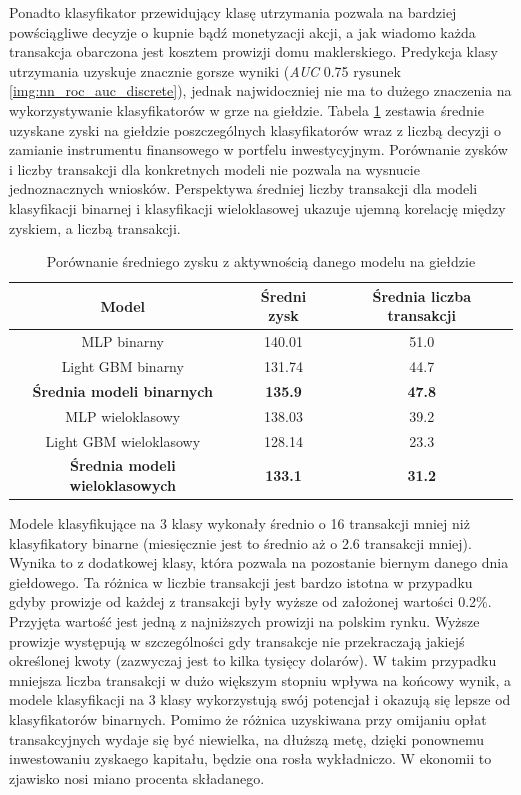 \documentclass[a4paper, twoside, 11pt, openright]{article}
\begin{document}
Ponadto klasyfikator przewidujący klasę utrzymania pozwala na bardziej powściągliwe decyzje o kupnie bądź monetyzacji akcji, a jak wiadomo każda transakcja obarczona jest kosztem prowizji domu maklerskiego. Predykcja klasy utrzymania uzyskuje znacznie gorsze wyniki (\textit{AUC} 0.75 rysunek \ref{img:nn_roc_auc_discrete}), jednak najwidoczniej nie ma to dużego znaczenia na wykorzystywanie klasyfikatorów w grze na giełdzie. Tabela \ref{tab:simulation_avg_value_vs_transactions} zestawia średnie uzyskane zyski na giełdzie poszczególnych klasyfikatorów wraz z liczbą decyzji o zamianie instrumentu finansowego w portfelu inwestycyjnym. Porównanie zysków i liczby transakcji dla konkretnych modeli nie pozwala na wysnucie jednoznacznych wniosków. Perspektywa średniej liczby transakcji dla modeli klasyfikacji binarnej i klasyfikacji wieloklasowej ukazuje ujemną korelację między zyskiem, a liczbą transakcji.


 \begin{table}[H]
    \centering
    \begin{tabular}{|c|c|c|}
    \hline
        \textbf{Model}  & \textbf{Średni zysk} & \textbf{Średnia liczba transakcji}\\ \hline
            MLP binarny & 140.01 & 51.0 \\ \hline
            Light GBM binarny & 131.74 & 44.7 \\ \hline 
            \textbf{Średnia modeli binarnych} & \textbf{135.9} & \textbf{47.8} \\ \hline \hline
            
            MLP wieloklasowy & 138.03 & 39.2 \\ \hline
            Light GBM wieloklasowy & 128.14 & 23.3 \\ \hline
            \textbf{Średnia modeli wieloklasowych} & \textbf{133.1} & \textbf{31.2} \\ \hline
    \end{tabular}
    \caption{Porównanie średniego zysku z aktywnością danego modelu na giełdzie}
    \label{tab:simulation_avg_value_vs_transactions}
\end{table} 

 Modele klasyfikujące na 3 klasy wykonały średnio o 16 transakcji mniej niż klasyfikatory binarne (miesięcznie jest to średnio aż o 2.6 transakcji mniej). Wynika to z dodatkowej klasy, która pozwala na pozostanie biernym danego dnia giełdowego. Ta różnica w liczbie transakcji jest bardzo istotna w przypadku gdyby prowizje od każdej z transakcji były wyższe od założonej wartości 0.2\%. Przyjęta wartość jest jedną z najniższych prowizji na polskim rynku. Wyższe prowizje występują w szczególności gdy transakcje nie przekraczają jakiejś określonej kwoty (zazwyczaj jest to kilka tysięcy dolarów). W takim przypadku mniejsza liczba transakcji w dużo większym stopniu wpływa na końcowy wynik, a modele klasyfikacji na 3 klasy wykorzystują swój potencjał i okazują się lepsze od klasyfikatorów binarnych. Pomimo że różnica uzyskiwana przy omijaniu opłat transakcyjnych wydaje się być niewielka, na dłuższą metę, dzięki ponownemu inwestowaniu zyskaego kapitału, będzie ona rosła wykładniczo. W ekonomii to zjawisko nosi miano procenta składanego.
 
\end{document}
